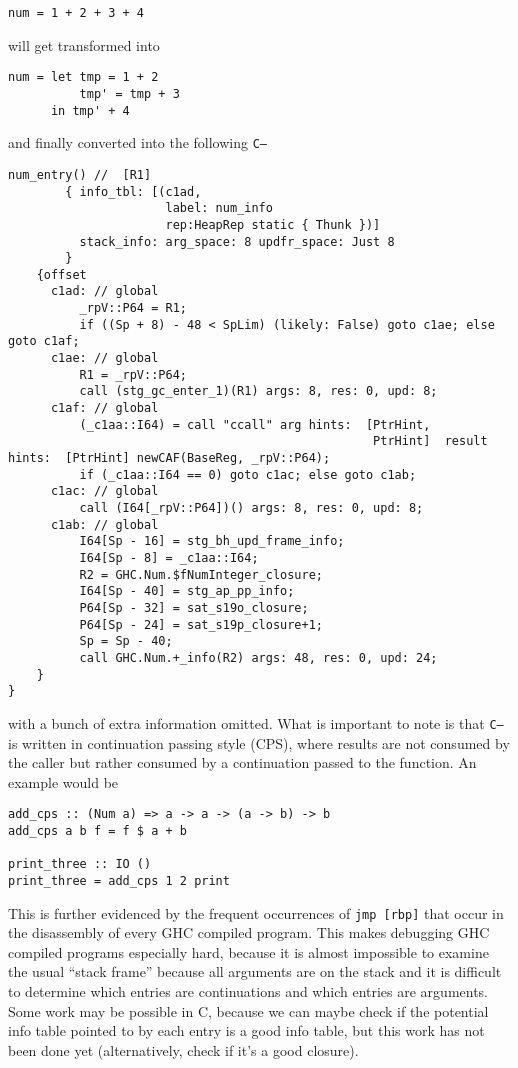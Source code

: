 \documentclass[letterpaper]{article}
\begin{document}
\begin{verbatim}
num = 1 + 2 + 3 + 4
\end{verbatim}

will get transformed into

\begin{verbatim}
num = let tmp = 1 + 2
          tmp' = tmp + 3
      in tmp' + 4
\end{verbatim}

and finally converted into the following \texttt{C--}

\begin{verbatim}
num_entry() //  [R1]
        { info_tbl: [(c1ad,
                      label: num_info
                      rep:HeapRep static { Thunk })]
          stack_info: arg_space: 8 updfr_space: Just 8
        }
    {offset
      c1ad: // global
          _rpV::P64 = R1;
          if ((Sp + 8) - 48 < SpLim) (likely: False) goto c1ae; else goto c1af;
      c1ae: // global
          R1 = _rpV::P64;
          call (stg_gc_enter_1)(R1) args: 8, res: 0, upd: 8;
      c1af: // global
          (_c1aa::I64) = call "ccall" arg hints:  [PtrHint,
                                                   PtrHint]  result hints:  [PtrHint] newCAF(BaseReg, _rpV::P64);
          if (_c1aa::I64 == 0) goto c1ac; else goto c1ab;
      c1ac: // global
          call (I64[_rpV::P64])() args: 8, res: 0, upd: 8;
      c1ab: // global
          I64[Sp - 16] = stg_bh_upd_frame_info;
          I64[Sp - 8] = _c1aa::I64;
          R2 = GHC.Num.$fNumInteger_closure;
          I64[Sp - 40] = stg_ap_pp_info;
          P64[Sp - 32] = sat_s19o_closure;
          P64[Sp - 24] = sat_s19p_closure+1;
          Sp = Sp - 40;
          call GHC.Num.+_info(R2) args: 48, res: 0, upd: 24;
    }
}
\end{verbatim}

with a bunch of extra information omitted. What is important to note is that
\texttt{C--} is written in continuation passing style (CPS), where results are
not consumed by the caller but rather consumed by a continuation passed to the
function. An example would be

\begin{verbatim}
add_cps :: (Num a) => a -> a -> (a -> b) -> b
add_cps a b f = f $ a + b

print_three :: IO ()
print_three = add_cps 1 2 print
\end{verbatim}

This is further evidenced by the frequent occurrences of \texttt{jmp
[rbp]} that occur in the disassembly of every GHC compiled program. This makes
debugging GHC compiled programs especially hard, because it is almost impossible
to examine the usual ``stack frame'' because all arguments are on the stack and
it is difficult to determine which entries are continuations and which entries
are arguments. Some work may be possible in C, because we can maybe check if the
potential info table pointed to by each entry is a good info table, but this
work has not been done yet (alternatively, check if it's a good closure).
\end{document}
